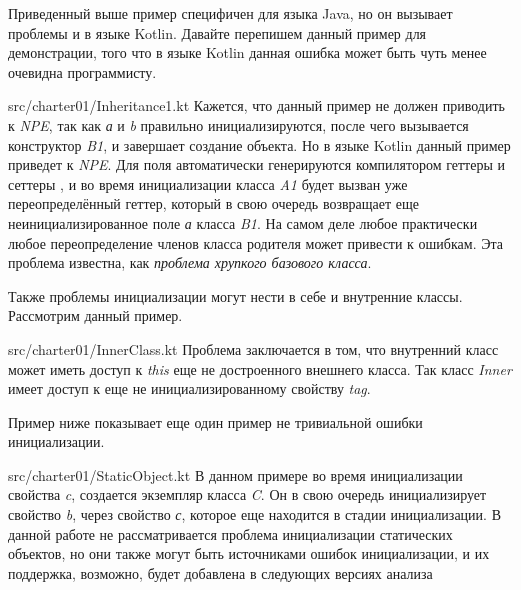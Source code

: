 Приведенный выше пример специфичен для языка Java, но он вызывает проблемы и в языке Kotlin.
Давайте перепишем данный пример для демонстрации,
того что в языке Kotlin данная ошибка может быть чуть менее очевидна программисту.

{src/charter01/Inheritance1.kt}
Кажется, что данный пример не должен приводить к \emph{NPE}, так как \emph{а} и \emph{b} правильно инициализируются,
после чего вызывается конструктор \emph{B1}, и завершает создание объекта.
Но в языке Kotlin данный пример приведет к \emph{NPE}.
Для поля автоматически генерируются компилятором геттеры и сеттеры
,
и во время инициализации класса \emph{A1} будет вызван уже переопределённый геттер,
который в свою очередь возвращает еще неинициализированное поле \emph{а} класса \emph{B1}.
На самом деле любое практически любое переопределение членов класса родителя может привести к ошибкам.
Эта проблема известна, как \textit{проблема хрупкого базового класса}\cite{fragile-base-class-problem}.

Также проблемы инициализации могут нести в себе и внутренние классы.
Рассмотрим данный пример.

{src/charter01/InnerClass.kt}
Проблема заключается в том, что внутренний класс может иметь доступ к \emph{this} еще не достроенного внешнего класса.
Так класс \emph{Inner} имеет доступ к еще не инициализированному свойству \emph{tag}.

Пример ниже показывает еще один пример не тривиальной ошибки инициализации.

{src/charter01/StaticObject.kt}
В данном примере во время инициализации свойства \emph{c}, создается экземпляр класса \emph{C}.
Он в свою очередь инициализирует свойство \emph{b}, через свойство \emph{с}, которое еще находится в стадии инициализации.
В данной работе не рассматривается проблема инициализации статических объектов,
но они также могут быть источниками ошибок инициализации, и их поддержка, возможно,
будет добавлена в следующих версиях анализа

